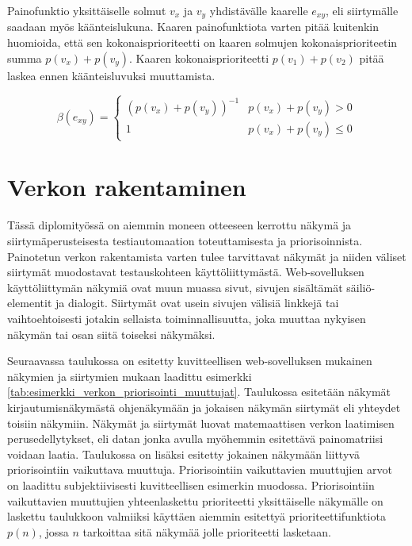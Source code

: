   Painofunktio yksittäiselle solmut \(v_x\) ja \(v_y\) yhdistävälle kaarelle \(e_{xy}\), eli siirtymälle saadaan myös käänteislukuna.
  Kaaren painofunktiota varten pitää kuitenkin huomioida, että sen kokonaisprioriteetti on kaaren solmujen kokonaisprioriteetin summa \(p(v_x) + p(v_y)\).
  Kaaren kokonaisprioriteetti \(p(v_1) + p(v_2)\) pitää laskea ennen käänteisluvuksi muuttamista.

  \[\beta(e_{xy}) = \begin{cases}
    (p(v_x) + p(v_y))^{-1} & p(v_x) + p(v_y) > 0 \\
    1 & p(v_x) + p(v_y) \leq 0
  \end{cases}\]

\section{Verkon rakentaminen} \label{ch:10_verkon_rakentaminen}

  Tässä diplomityössä on aiemmin moneen otteeseen kerrottu näkymä ja siirtymäperusteisesta testiautomaation toteuttamisesta ja priorisoinnista.
  Painotetun verkon rakentamista varten tulee tarvittavat näkymät ja niiden väliset siirtymät muodostavat testauskohteen käyttöliittymästä.
  Web-sovelluksen käyttöliittymän näkymiä ovat muun muassa sivut, sivujen sisältämät säiliö-elementit ja dialogit.
  Siirtymät ovat usein sivujen välisiä linkkejä tai vaihtoehtoisesti jotakin sellaista toiminnallisuutta, joka muuttaa nykyisen näkymän tai osan siitä toiseksi näkymäksi.

  Seuraavassa taulukossa on esitetty kuvitteellisen web-sovelluksen mukainen näkymien ja siirtymien mukaan laadittu esimerkki \ref{tab:esimerkki_verkon_priorisointi_muuttujat}.
  Taulukossa esitetään näkymät kirjautumisnäkymästä ohjenäkymään ja jokaisen näkymän siirtymät eli yhteydet toisiin näkymiin.
  Näkymät ja siirtymät luovat matemaattisen verkon laatimisen perusedellytykset, eli datan jonka avulla myöhemmin esitettävä painomatriisi voidaan laatia.
  Taulukossa on lisäksi esitetty jokainen näkymään liittyvä priorisointiin vaikuttava muuttuja.
  Priorisointiin vaikuttavien muuttujien arvot on laadittu subjektiivisesti kuvitteellisen esimerkin muodossa.
  Priorisointiin vaikuttavien muuttujien yhteenlaskettu prioriteetti yksittäiselle näkymälle on laskettu taulukkoon valmiiksi käyttäen aiemmin esitettyä prioriteettifunktiota \(p(n)\), jossa \(n\) tarkoittaa sitä näkymää jolle prioriteetti lasketaan.


